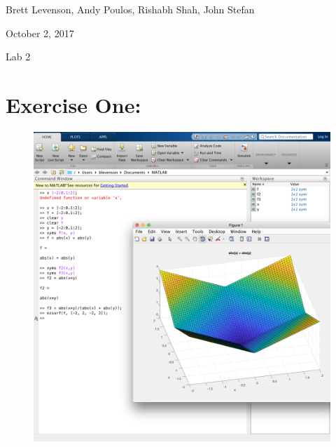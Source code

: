 \documentclass[11pt]{article}
\begin{document}
{\Large\noindent Brett Levenson, Andy Poulos, Rishabh Shah, John Stefan

\noindent October 2, 2017

\noindent Lab 2 \\}

\section*{Exercise One:}

\begin{figure}[H]
	\centering
	\includegraphics[width=\textwidth]{PartOne_1}
\end{figure}
\end{document}
